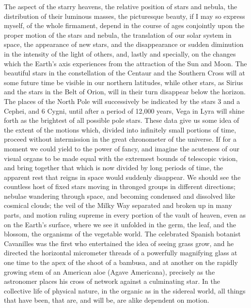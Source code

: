 The aspect of the starry heavens, the relative position of stars and nebula, the distribution of their luminous masses, the picturesque beauty, if I may so express myself, of the whole firmament, depend in the course of ages conjointly upon the proper motion of the stars and nebula, the translation of our solar system in space, the appearance of new stars, and the disappearance or sudden diminution in the intensity of the light of others, and, lastly and specially, on the changes which the Earth's axis experiences from the attraction of the Sun and Moon. The beautiful stars in the constellation of the Centaur and the Southern Cross will at some future time be visible in our northern latitudes, while other stars, as Sirius and the stars in the Belt of Orion, will in their turn disappear below the horizon. The places of the North Pole will successively be indicated by the stars 3 and a Cephei, and 6 Cygni, until after a period of 12,000 years, Vega in Lyra will shine forth as the brightest of all possible pole stars. These data give us some idea of the extent of the motions which, divided into infinitely small portions of time, proceed without intermission in the great chronometer of the universe. If for a moment we could yield to the power of fancy, and imagine the acuteness of our visual organs to be made equal with the extremest bounds of telescopic vision, and bring together that which is now divided by long periods of time, the apparent rest that reigns in space would suddenly disappear. We should see the countless host of fixed stars moving in thronged groups in different directions; nebulae wandering through space, and becoming condensed and dissolved like cosmical clouds; the veil of the Milky Way separated and broken up in many parts, and motion ruling supreme in every portion of the vault of heaven, even as on the Earth's surface, where we see it unfolded in the germ, the leaf, and the blossom, the organisms of the vegetable world. The celebrated Spanish botanist Cavanilles was the first who entertained the idea of seeing grass grow, and he directed the horizontal micrometer threads of a powerfully magnifying glass at one time to the apex of the shoot of a bambusa, and at another on the rapidly growing stem of an American aloe (Agave Americana), precisely as the astronomer places his cross of network against a culminating star. In the collective life of physical nature, in the organic as in the sidereal world, all things that have been, that are, and will be, are alike dependent on motion.